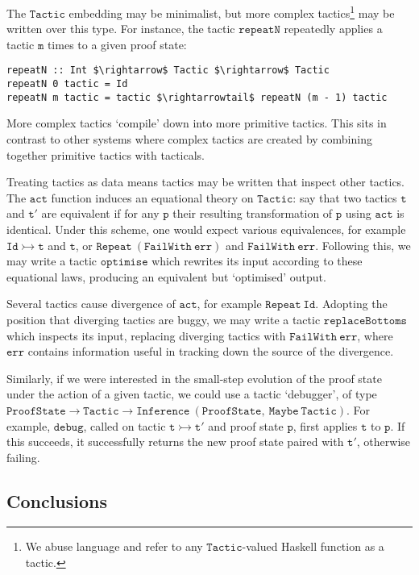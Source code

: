 \documentclass{llncs}
\begin{document}
The $\mathtt{Tactic}$ embedding may be minimalist, but more complex tactics\footnote{We abuse language and refer to any $\mathtt{Tactic}$-valued Haskell function as a tactic.} may be written over this type.
For instance, the tactic $\mathtt{repeatN}$ repeatedly applies a tactic $\mathtt{m}$ times to a given proof state:
\begin{lstlisting}
repeatN :: Int $\rightarrow$ Tactic $\rightarrow$ Tactic
repeatN 0 tactic = Id
repeatN m tactic = tactic $\rightarrowtail$ repeatN (m - 1) tactic
\end{lstlisting}

More complex tactics `compile' down into more primitive tactics.
This sits in contrast to other systems where complex tactics are created by combining together primitive tactics with tacticals.

Treating tactics as data means tactics may be written that inspect other tactics.
The $\mathtt{act}$ function induces an equational theory on $\mathtt{Tactic}$: say that two tactics $\mathtt{t}$ and $\mathtt{t'}$ are equivalent if for any $\mathtt{p}$ their resulting transformation of $\mathtt{p}$ using $\mathtt{act}$ is identical.
Under this scheme, one would expect various equivalences, for example $\mathtt{Id \rightarrowtail t}$ and $\mathtt{t}$, or $\mathtt{Repeat\ (FailWith\ err)}$ and $\mathtt{FailWith\ err}$.
Following this, we may write a tactic $\mathtt{optimise}$ which rewrites its input according to these equational laws, producing an equivalent but `optimised' output.

Several tactics cause divergence of $\mathtt{act}$, for example $\mathtt{Repeat\ Id}$.
Adopting the position that diverging tactics are buggy, we may write a tactic $\mathtt{replaceBottoms}$ which inspects its input, replacing diverging tactics with $\mathtt{FailWith\ err}$, where $\mathtt{err}$ contains information useful in tracking down the source of the divergence.

Similarly, if we were interested in the small-step evolution of the proof state under the action of a given tactic, we could use a tactic `debugger', of type $\mathtt{ProofState \rightarrow Tactic \rightarrow Inference\ (ProofState,\ Maybe\ Tactic)}$.
For example, $\mathtt{debug}$, called on tactic $\mathtt{t \rightarrowtail t'}$ and proof state $\mathtt{p}$, first applies $\mathtt{t}$ to $\mathtt{p}$.
If this succeeds, it successfully returns the new proof state paired with $\mathtt{t'}$, otherwise failing.

\subsection*{Conclusions}
\label{sect.conclusions}
\end{document}
